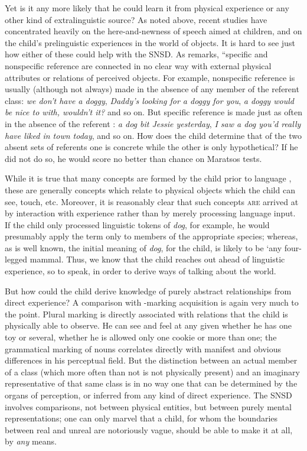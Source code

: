 Yet is it any more likely that he could learn it from physical experience or any other kind of extralinguistic source? As noted above, recent studies have concentrated heavily on the here-and-newness of speech aimed at children, and on the child's prelinguistic experiences in the world of objects. It is hard to see just how either of these could help with the SNSD. As \citet[94]{Maratsos1976} remarks, ``specific and nonspecific reference are connected in no clear way with external physical attributes or relations of perceived objects. For example, nonspecific reference is usually (although not always) made in the absence of any member of the referent class: \textit{we don't have a doggy}, \textit{Daddy's looking for a doggy for you}, \textit{a doggy would be nice to  with, wouldn't it?} and so on. But specific reference is made just as often in the absence of the referent : \textit{a dog bit Jessie yesterday}, \textit{I saw a dog you'd really have liked in town today}, and so on. How does the child determine that of the two absent sets of referents one is concrete while the other is only hypothetical? If he did not do so, he would score no better than chance on Maratsos tests.


While it is true that many concepts are formed by the child prior to language , these are generally concepts which relate to physical objects which the child can see, touch, etc. Moreover, it is reasonably clear that such concepts \textsc{are} arrived at by interaction with experience rather than by merely processing language input. If the child only processed linguistic tokens of \textit{dog}, for example, he would presumably apply the term only to members of the appropriate species; whereas, as is well known, the initial meaning of \textit{dog}, for the child, is likely to be `any four-legged mammal. Thus, we know that the child reaches out ahead of linguistic experience, so to speak, in order to derive ways of talking about the world.

But how could the child derive knowledge of purely abstract relationships from direct experience? A comparison with -marking acquisition is again very much to the point. Plural marking is directly associated with relations that the child is physically able to observe. He can see and feel at any given  whether he has one toy or several, whether he is allowed only one cookie or more than one; the grammatical marking of nouns correlates directly with manifest and obvious differences in his perceptual field. But the distinction between an actual member of a class (which more often than not is not physically present) and an imaginary representative of that same class is in no way one that can be determined by the organs of perception, or inferred from any kind of direct experience. The SNSD involves comparisons, not between physical entities, but between purely mental representations; one can only marvel that a child, for whom the boundaries between real and unreal are notoriously vague, should be able to make it at all, by \textit{any} means.

